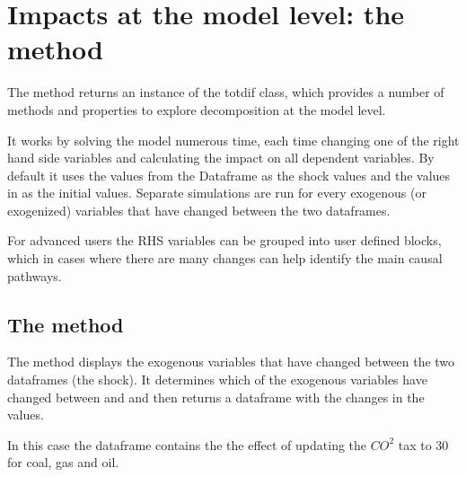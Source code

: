 \documentclass[letterpaper,10pt,english]{jupyterBook}
\begin{document}
\section{Impacts at the model level: the  method}
\label{\detokenize{content/06_ModelAnalytics/AttributionSomeFeatures:impacts-at-the-model-level-the-totdif-method}}
\sphinxAtStartPar
The method  returns an instance of the totdif class, which provides a number of methods and properties to explore decomposition at the model level.

\sphinxAtStartPar
It works by solving the model numerous time, each time changing one of the right hand side variables and calculating the impact on all dependent variables. By default it uses the values from the  Dataframe as the shock values and the values in  as the initial values. Separate simulations are run for every exogenous (or exogenized) variables that have changed between the two dataframes.

\sphinxAtStartPar
For advanced users the RHS variables can be grouped into user defined blocks, which in cases where there are many changes can help identify the main causal pathways.


\subsection{The  method}
\label{\detokenize{content/06_ModelAnalytics/AttributionSomeFeatures:the-exo-dif-method}}
\sphinxAtStartPar
The  method displays the exogenous variables that have changed between the two dataframes (the shock). It determines which of the exogenous variables  have changed between and  and then returns a dataframe with the changes in the values.

\sphinxAtStartPar
In this case the dataframe contains the the effect of updating the \(CO^2\) tax to 30 for coal, gas and oil.
\end{document}
